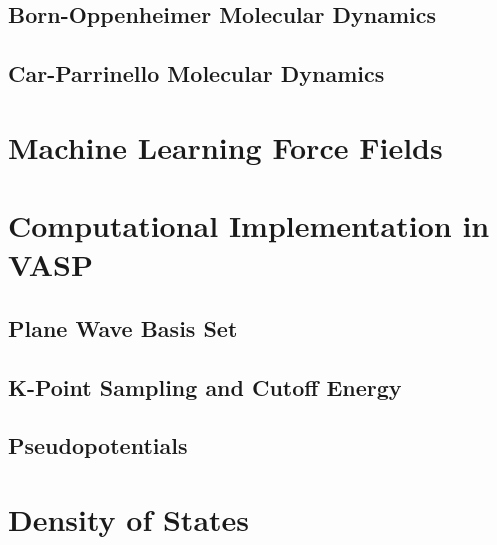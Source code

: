 \subsection{Born-Oppenheimer Molecular Dynamics}

\subsection{Car-Parrinello Molecular Dynamics}

\section{Machine Learning Force Fields}

\section{Computational Implementation in VASP}
\subsection{Plane Wave Basis Set}
\subsection{K-Point Sampling and Cutoff Energy}
\subsection{Pseudopotentials}
\section{Density of States}



